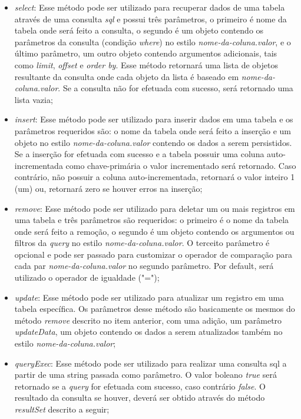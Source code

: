 \begin{itemize}
	\item \textit{select}: Esse método pode ser utilizado para recuperar dados de uma tabela através de uma consulta \textit{sql} e possui três parâmetros, o primeiro é nome da tabela onde será feito a consulta, o segundo é um objeto contendo os parâmetros da consulta (condição \textit{where}) no estilo \textit{nome-da-coluna.valor}, e o último parâmetro, um outro objeto contendo argumentos adicionais, tais como \textit{limit}, \textit{offset} e \textit{order by}. Esse método retornará uma lista de objetos resultante da consulta onde cada objeto da lista é baseado em \textit{nome-da-coluna.valor}. Se a consulta não for efetuada com sucesso, será retornado uma lista vazia;

	\item \textit{insert}: Esse método pode ser utilizado para inserir dados em uma tabela e os parâmetros requeridos são: o nome da tabela onde será feito a inserção e um objeto no estilo \textit{nome-da-coluna.valor} contendo os dados a serem persistidos. Se a inserção for efetuada com sucesso e a tabela possuir uma coluna auto-incrementada como chave-primária o valor incrementado será retornado. Caso contrário, não possuir a coluna auto-incrementada, retornará o valor inteiro 1 (um) ou, retornará zero se houver erros na inserção;

	\item \textit{remove}: Esse método pode ser utilizado para deletar um ou mais registros em uma tabela e três parâmetros são requeridos: o primeiro é o nome da tabela onde será feito a remoção, o segundo é um objeto contendo os argumentos ou filtros da \textit{query} no estilo \textit{nome-da-coluna.valor}. O terceito parâmetro é opcional e pode ser passado para customizar o operador de comparação para cada par \textit{nome-da-coluna.valor} no segundo parâmetro. Por default, será utilizado o operador de igualdade ("=");

	\item \textit{update}: Esse método pode ser utilizado para atualizar um registro em uma tabela específica. Os parâmetros desse método são basicamente os mesmos do método \textit{remove} descrito no item anterior, com uma adição, um parâmetro \textit{updateData}, um objeto contendo os dados a serem atualizados também no estilo \textit{nome-da-coluna.valor};

	\item \textit{queryExec}: Esse método pode ser utilizado para realizar uma consulta sql a partir de uma string passada como parâmetro. O valor boleano \textit{true} será retornado se a \textit{query} for efetuada com sucesso, caso contrário \textit{false}. O resultado da consulta se houver, deverá ser obtido através do método \textit{resultSet} descrito a seguir;


\end{itemize}
